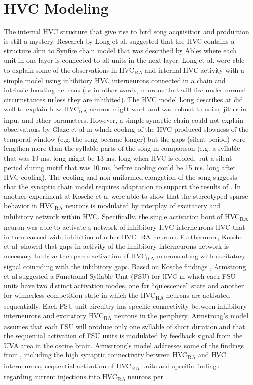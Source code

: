 \documentclass[draft,12pt,oneside]{CUNY_PhD}
\begin{document}
\section{HVC Modeling}
The internal HVC structure that give rise to bird song acquisition and production is still a mystery. Research by Long et al. \cite{5} suggested that the HVC contains a structure akin to Synfire chain model that was described by Ables \cite{18} where each unit in one layer is connected to all units in the next layer. Long et al. \cite{5} were able to explain some of the observations in HVC\textsubscript{RA} and internal HVC activity with a simple model using inhibitory HVC interneurons connected in a chain and intrinsic bursting neurons (or in other words, neurons that will fire under normal circumstances unless they are inhibited). The HVC model Long describes at \cite{5} did well to explain how HVC\textsubscript{RA} neuron might work and was robust to noise, jitter in input and other parameters. However, a simple synaptic chain could not explain observations by Glaze et al \cite{19} in which cooling of the HVC produced slowness of the temporal window (e.g. the song became longer) but the gaps (silent period) were lengthen more than the syllable parts of the song in comparison (e.g. a syllable that was 10 ms. long might be 13 ms. long when HVC is cooled, but a silent period during motif that was 10 ms. before cooling could be 15 ms. long after HVC cooling). The cooling and non-uniformed elongation of the song suggests that the synaptic chain model requires adaptation to support the results of \cite{19}. 
In another experiment at Kosche et al \cite{20} were able to show that the stereotyped sparse behavior in HVC\textsubscript{RA} neurons is modulated by interplay of excitatory and inhibitory network within HVC. Specifically, the single activation bout of HVC\textsubscript{RA} neuron was able to activate a network of inhibitory HVC interneurons HVC that in turn caused wide inhibition of other HVC RA neurons. Furthermore, Kosche et al. \cite{20} showed that gaps in activity of the inhibitory interneurons network is necessary to drive the sparse activation of HVC\textsubscript{RA} neurons along with excitatory signal coinciding with the inhibitory gaps. 
Based on Kosche findings \cite{20}, Armstrong et al \cite{21} suggested a Functional Syllable Unit (FSU) for HVC in which each FSU units have two distinct activation modes, one for “quiescence” state and another for winnerless competition state in which the HVC\textsubscript{RA} neurons are activated sequentially. Each FSU unit circuitry has specific connectivity between inhibitory interneurons and excitatory HVC\textsubscript{RA} neurons in the periphery. Armstrong’s model assumes that each FSU will produce only one syllable of short duration and that the sequential activation of FSU units is modulated by feedback signal from the UVA area in the oscine brain. Armstrong’s model addresses some of the findings from \cite{20}, including the high synaptic connectivity between HVC\textsubscript{RA} and HVC interneurons, sequential activation of HVC\textsubscript{RA} units and specific findings regarding current injections into HVC\textsubscript{RA} neurons per \cite{20}. 
\end{document}
